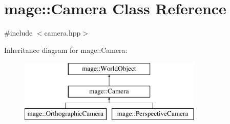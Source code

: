 \hypertarget{classmage_1_1_camera}{}\section{mage\+:\+:Camera Class Reference}
\label{classmage_1_1_camera}


{\ttfamily \#include $<$camera.\+hpp$>$}

Inheritance diagram for mage\+:\+:Camera\+:\begin{figure}[H]
\begin{center}
\leavevmode
\includegraphics[height=3.000000cm]{classmage_1_1_camera}
\end{center}
\end{figure}
